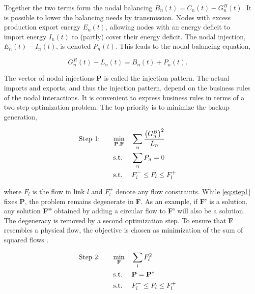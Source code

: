 \documentclass[a4paper, 5p, sort&compress]{elsarticle}%
\newcommand{\paren}[1]{\left(#1\right)}
\begin{document}
Together the two terms form the nodal balancing
$B_{n}(t) = C_{n}(t) - G^{B}_{n}(t)$.  It is possible to lower the
balancing needs by transmission. Nodes with excess production export
energy $E_{n}(t)$, allowing nodes with an energy deficit to import
energy $I_{n}(t)$ to (partly) cover their energy deficit. The nodal
injection, $E_{n}(t) - I_{n}(t)$, is denoted $P_{n}(t)$. This leads to
the nodal balancing equation,

\begin{equation}
  \label{eq:nodal-balancing}
  G^{R}_{n}(t) - L_{n}(t) = B_{n}(t) + P_{n}(t) .
\end{equation}

The vector of nodal injections $\mathbf{P}$ is called the injection
pattern. The actual imports and exports, and thus the injection
pattern, depend on the business rules of the nodal interactions. It is
convenient to express business rules in terms of a two step
optimization problem. The top priority is to minimize the backup
generation,

\begin{equation}
  \label{eq:step1}
  \begin{aligned}
    \text{Step 1: \hspace{15pt}}& \underset{\mathbf{P}, \mathbf{F}}{\text{min}}
    & & \sum_{n} \frac{\paren{G_{n}^{B}}^{2}}{L_{n}} \\
    & \text{s.t.}
    & & \sum_{n} P_{n} = 0 \\ %
    & \text{s.t.}
    & & F_{l}^{-} \leq F_{l} \leq F_{l}^{+}
  \end{aligned}
\end{equation}

where $F_{l}$ is the flow in link $l$ and $F_{l}^{\pm}$ denote any
flow constraints. While \cref{eq:step1} fixes \textbf{P}, the problem
remains degenerate in \textbf{F}. As an example, if \textbf{F'} is a
solution, any solution \textbf{F''} obtained by adding a circular flow
to \textbf{F'} will also be a solution. The degeneracy is removed by a
second optimization step. To ensure that \textbf{F} resembles a
physical flow, the objective is chosen as minimization of the sum of
squared flows \cite{Magnus}.

\begin{equation}
  \begin{aligned}
    \label{eq:step2}
    \text{Step 2: \hspace{15pt}} & \underset{\mathbf{F}}{\text{min}}
    & & \sum_{l} F_{l}^{2} \\
    & \text{s.t.}
    & & \mathbf{P} = \mathbf{P}^{*} \\ %
    & \text{s.t.}
    & & F_{l}^{-} \leq F_{l} \leq F_{l}^{+} \\
  \end{aligned}
\end{equation}
\end{document}
